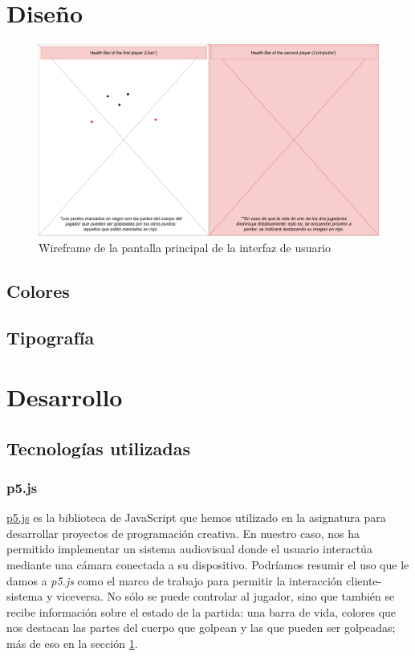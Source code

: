 \documentclass{article}
\begin{document}
\section{Diseño}
\label{section:design}

\begin{figure}[h]
    \centering
    \includegraphics[width=\textwidth]{img/wireframe1}
    \caption{Wireframe de la pantalla principal de la interfaz de usuario}
    \label{fig:mesh1}
\end{figure}

\subsection{Colores}

\subsection{Tipografía}

\section{Desarrollo}
\label{section:development}

\subsection{Tecnologías utilizadas}

\subsubsection{p5.js}

\href{https://p5js.org/es/}{p5.js} es la biblioteca de JavaScript que hemos utilizado en la asignatura para desarrollar proyectos de programación creativa. En nuestro caso, nos ha permitido implementar un sistema audiovisual donde el usuario interactúa mediante una cámara conectada a su dispositivo. Podríamos resumir el uso que le damos a \textit{p5.js} como el marco de trabajo para permitir la interacción cliente-sistema y viceversa. No sólo se puede controlar al jugador, sino que también se recibe información sobre el estado de la partida: una barra de vida, colores que nos destacan las partes del cuerpo que golpean y las que pueden ser golpeadas; más de eso en la sección \ref{section:design}.
\end{document}
